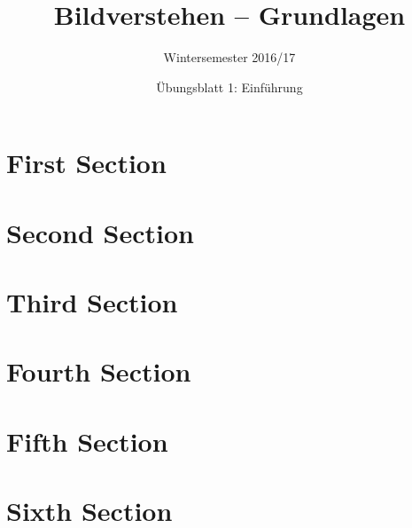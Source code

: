 \documentclass[%
  lang=english,
]{tumtest}
\title{Bildverstehen -- Grundlagen}
\subtitle{Wintersemester 2016/17}
\author{Übungsblatt 1: Einführung}
\date{\hrulefill}
\begin{document}
  
  
  \section{First Section}
  \blindtext
  
  \section{Second Section}
  \blindtext
  
  \section{Third Section}
  \blindtext
  
  \section{Fourth Section}
  \blindtext
  
  \section{Fifth Section}
  \blindtext
  
  \section{Sixth Section}
  \blindtext
\end{document}
